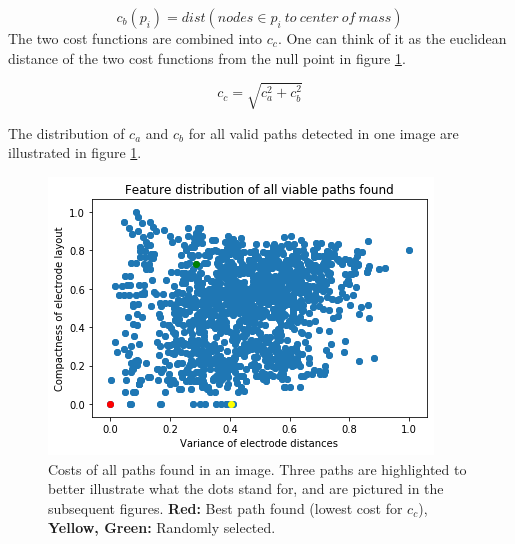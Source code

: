 \documentclass[a4paper, 11pt]{article}
\begin{document}
$$ c_b(p_i)=dist (nodes \in p_i\ to\ center\ of\ mass)$$
The two cost functions are combined into $c_ {c}$. One can think of it as the euclidean distance of the two cost functions from the null point in figure \ref{feature_distribution}.

$$c_{c} = \sqrt{c_a^2+c_b^2}$$

The distribution of $c_a$ and $c_b$ for all valid paths detected in one image are illustrated in figure \ref{feature_distribution}.

\begin{figure}[ht]
	\centering
  \includegraphics[width=.5\textwidth]{feature_distribution.png}
	\caption{Costs of all paths found in an image. Three paths are highlighted to better illustrate what the dots stand for, and are pictured in the subsequent figures. \textbf{Red:} Best path found (lowest cost for $c_c$), \textbf{Yellow, Green:} Randomly selected.}
	\label{feature_distribution}
\end{figure}
\end{document}
